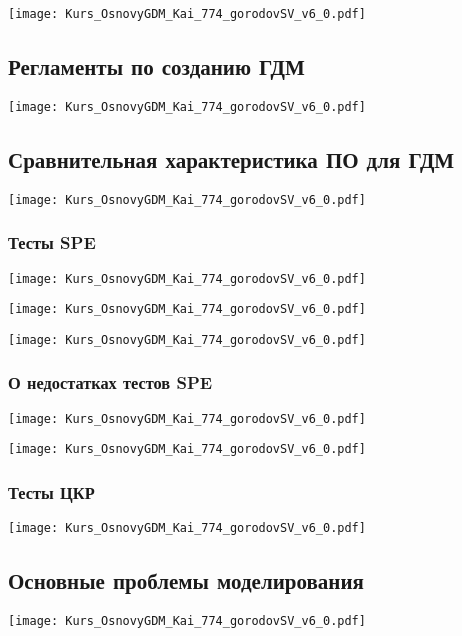 \documentclass[main.tex]{subfiles}
\begin{document}
\texttt{[image: Kurs\_OsnovyGDM\_Kai\_774\_gorodovSV\_v6\_0.pdf]}

\subsection{Регламенты по созданию ГДМ}

\texttt{[image: Kurs\_OsnovyGDM\_Kai\_774\_gorodovSV\_v6\_0.pdf]}

\subsection{Сравнительная характеристика ПО для ГДМ}

\texttt{[image: Kurs\_OsnovyGDM\_Kai\_774\_gorodovSV\_v6\_0.pdf]}

\subsubsection{Тесты SPE}

\texttt{[image: Kurs\_OsnovyGDM\_Kai\_774\_gorodovSV\_v6\_0.pdf]}

\texttt{[image: Kurs\_OsnovyGDM\_Kai\_774\_gorodovSV\_v6\_0.pdf]}

\texttt{[image: Kurs\_OsnovyGDM\_Kai\_774\_gorodovSV\_v6\_0.pdf]}

\subsubsection{О недостатках тестов SPE}

\texttt{[image: Kurs\_OsnovyGDM\_Kai\_774\_gorodovSV\_v6\_0.pdf]}

\texttt{[image: Kurs\_OsnovyGDM\_Kai\_774\_gorodovSV\_v6\_0.pdf]}

\subsubsection{Тесты ЦКР}

\texttt{[image: Kurs\_OsnovyGDM\_Kai\_774\_gorodovSV\_v6\_0.pdf]}

\subsection{Основные проблемы моделирования}

\texttt{[image: Kurs\_OsnovyGDM\_Kai\_774\_gorodovSV\_v6\_0.pdf]}
\end{document}

